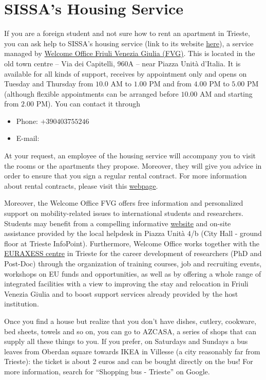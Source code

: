 \documentclass{sissavademecum}
\begin{document}
\section{SISSA's Housing Service}

If you are a foreign student and not sure how to rent an apartment in Trieste, you can ask help to SISSA's housing service (link to its website \href{https://www.sissa.it/housing}{here}), a service managed by \href{http://www.welcomeoffice.fvg.it}{Welcome Office Friuli Venezia Giulia (FVG)}. This is located in the old town centre -- Via dei Capitelli, 960A -- near Piazza Unità d'Italia. It is available for all kinds of support, receives by appointment only and opens on Tuesday and Thursday from $10.0$ AM to $1.00$ PM and from $4.00$ PM to $5.00$ PM (although flexible appointments can be arranged before $10.00$ AM and starting from $2.00$ PM). You can contact it through 
\begin{itemize}
	\item Phone: $+39 040 375 5246$
	\item E-mail: 
\end{itemize}

At your request, an employee of the housing service will accompany you to visit the rooms or the apartments they propose. Moreover, they will give you advice in order to ensure that you sign a regular rental contract. For more information about rental contracts, please visit this \href{https://wiki.sissa.it/students/index.php/House_rental_contract}{webpage}.

Moreover, the Welcome Office FVG offers free information and personalized support on mobility-related issues to international students and researchers. Students may benefit from a compelling informative \href{link http://www.welcomeoffice.fvg.it/news/}{website} and on-site assistance provided by the local helpdesk in Piazza Unit\`a $4$/b (City Hall - ground floor at Trieste InfoPoint). Furthermore, Welcome Office works together with the \href{https://euraxess.ec.europa.eu/}{EURAXESS centre} in Trieste for the career development of researchers (PhD and Post-Doc) through the organization of training courses, job and recruiting events, workshops on EU funds and opportunities, as well as by offering a whole range of integrated facilities with a view to improving the stay and relocation in Friuli Venezia Giulia and to boost support services already provided by the host institution. 

Once you find a house but realize that you don't have dishes, cutlery, cookware, bed sheets, towels and so on, you can go to AZCASA, a series of shops that can supply all these things to you. If you prefer, on Saturdays and Sundays a bus leaves from Oberdan square towards IKEA in Villesse (a city reasonably far from Trieste): the ticket is about 2 euros and can be bought directly on the bus! For more information, search for ``Shopping bus - Trieste'' on Google.
\end{document}
